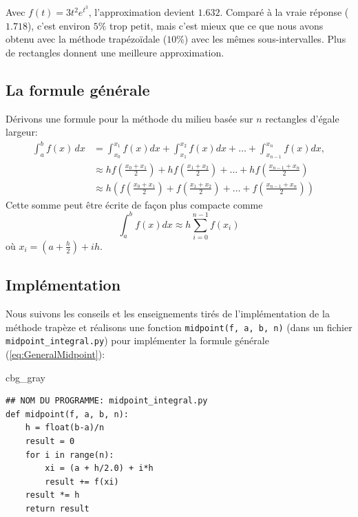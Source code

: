 \documentclass[%
oneside,                 %
final,                   %
10pt]{article}
\newenvironment{_cod_tight}[1]{
   \def\FrameCommand{\colorbox{#1}}
   \FrameRule0.6pt\MakeFramed {\FrameRestore}\vskip3mm}
   {\vskip0mm\endMakeFramed}
\newenvironment{cod}[1]{
\bgroup\rmfamily
\fboxsep=0mm\relax
\begin{_cod_tight}{#1}
\list{}{\parsep=-2mm\parskip=0mm\topsep=0pt\leftmargin=2mm
\rightmargin=2\leftmargin\leftmargin=4pt\relax}
\item\relax}
{\endlist\end{_cod_tight}\egroup}
\begin{document}
Avec $f(t) = 3t^{2}e^{t^3}$, l'approximation devient $1.632$. Comparé à la vraie réponse ($1.718$), c'est environ $5 \%$ trop petit, mais c'est mieux que ce que nous avons obtenu avec la méthode trapézoïdale ($10 \%$) avec les mêmes sous-intervalles. Plus de rectangles donnent une meilleure approximation.

\subsection{La formule générale}
Dérivons une formule pour la méthode du milieu basée sur $n$ rectangles d'égale largeur:
\begin{align}
\int_a^b f(x)\,dx &= \int_{x_0}^{x_1} f(x)dx + \int_{x_1}^{x_2} f(x)dx +
                     \ldots + \int_{x_{n-1}}^{x_n} f(x)dx,     \nonumber \\
                  &\approx h f\left(\frac{x_0 + x_1}{2}\right) +
                   h f\left(\frac{x_1 + x_2}{2}\right) + \ldots +
                   h f\left(\frac{x_{n-1} + x_n}{2}\right) \\
                  &\approx h \left(f\left(\frac{x_0 + x_1}{2}\right) +
                  f\left(\frac{x_1 + x_2}{2}\right) + \ldots +
                  f\left(\frac{x_{n-1} + x_n}{2}\right)\right)
\end{align}
Cette somme peut être écrite de façon plus compacte comme
\begin{equation} \label{eq:GeneralMidpoint}
\int_a^b f(x) dx \approx h \sum_{i=0}^{n-1}f(x_i)
\end{equation}
où $x_i = \left(a + \frac{h}{2}\right) + ih$.

\subsection{Implémentation}
\label{sec:implementation}
Nous suivons les conseils et les enseignements tirés de l'implémentation de la méthode trapèze et réalisons une fonction \texttt{midpoint(f, a, b, n)} (dans un fichier \Verb!midpoint_integral.py!) pour implémenter la formule générale (\ref{eq:GeneralMidpoint}):

\begin{cod}{cbg_gray}\begin{verbatim}
## NOM DU PROGRAMME: midpoint_integral.py
def midpoint(f, a, b, n):
    h = float(b-a)/n
    result = 0
    for i in range(n):
        xi = (a + h/2.0) + i*h
        result += f(xi)
    result *= h
    return result
\end{verbatim}
\end{cod}
\noindent
\end{document}
